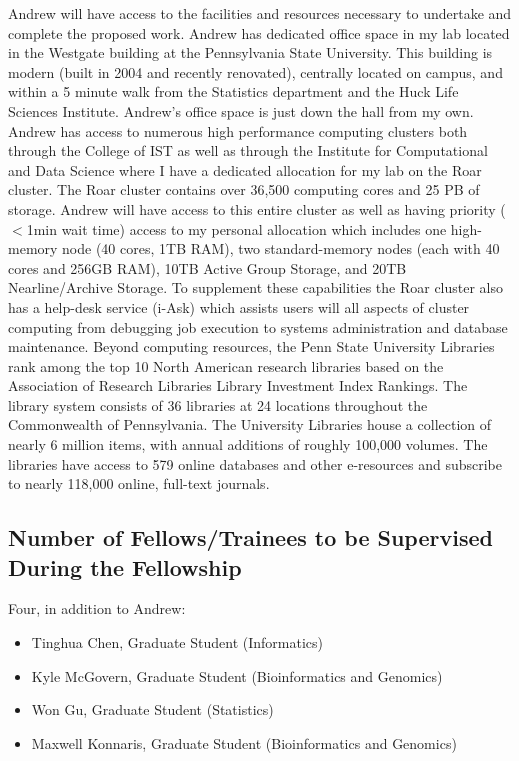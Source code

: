\documentclass{NIHGrant}
\begin{document}
Andrew will have access to the facilities and resources necessary to undertake and
complete the proposed work. Andrew has dedicated office space in my lab located in
the Westgate building at the Pennsylvania State University. This building is
modern (built in 2004 and recently renovated), centrally located on campus, and
within a 5 minute walk from the Statistics department and the Huck Life Sciences
Institute. Andrew's office space is just down the hall from my own. Andrew has
access to numerous high performance computing clusters both through the College
of IST as well as through the Institute for Computational and Data Science where
I have a dedicated allocation for my lab on the Roar cluster. The Roar cluster
contains over 36,500 computing cores and 25 PB of storage. Andrew will have access
to this entire cluster as well as having priority (\(<\)1min wait time) access
to my personal allocation which includes one high-memory node (40 cores, 1TB
RAM), two standard-memory nodes (each with 40 cores and 256GB RAM), 10TB Active
Group Storage, and 20TB Nearline/Archive Storage. To supplement these
capabilities the Roar cluster also has a help-desk service (i-Ask) which assists
users will all aspects of cluster computing from debugging job execution to
systems administration and database maintenance. Beyond computing resources, the
Penn State University Libraries rank among the top 10 North American research
libraries based on the Association of Research Libraries Library Investment
Index Rankings. The library system consists of 36 libraries at 24 locations
throughout the Commonwealth of Pennsylvania. The University Libraries house a
collection of nearly 6 million items, with annual additions of roughly 100,000
volumes. The libraries have access to 579 online databases and other e-resources
and subscribe to nearly 118,000 online, full-text journals.


\subsection*{Number of Fellows/Trainees to be Supervised During the Fellowship}

Four, in addition to Andrew: 

\begin{itemize}
\item Tinghua Chen, Graduate Student (Informatics)
\item Kyle McGovern, Graduate Student (Bioinformatics and Genomics)
\item Won Gu, Graduate Student (Statistics)
\item Maxwell Konnaris, Graduate Student (Bioinformatics and Genomics)
\end{itemize}
\end{document}
